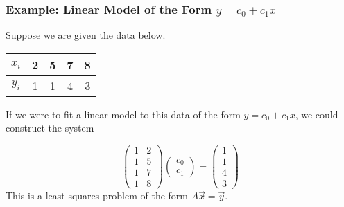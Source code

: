 \begin{frame}
\frametitle{Example: Linear Model of the Form $y = c_0 + c_1x$}

    Suppose we are given the data below. 
    \begin{center}
    \begin{tabular}{c|cccc} 
    $ x_i$ & 2 & 5 & 7 & 8 
    \\ \hline 
    $ y_i$ & 1 & 1 & 4 & 3 
    \end{tabular}
    \end{center}
    
    If we were to fit a linear model to this data of the form $ y= c_0 + c_1 x$, we could construct the system
        \pause

    \begin{equation*}
    \begin{pmatrix}
    1 & 2 \\ 1 & 5 \\ 1 & 7 \\ 1 & 8 
    \end{pmatrix} \begin{pmatrix}
    c _0 \\ c _1 
    \end{pmatrix} = \begin{pmatrix}
    1 \\ 1 \\ 4 \\ 3 
    \end{pmatrix}
    \end{equation*}
    This is a least-squares problem of the form $A \vec x = \vec y$. 
    
\end{frame}

